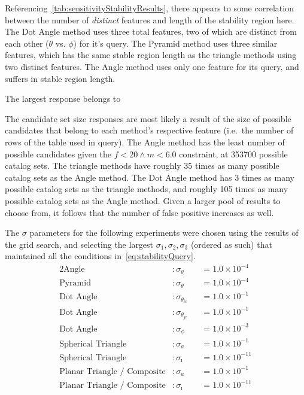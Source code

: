 Referencing~\autoref{tab:sensitivityStabilityResults}, there appears to some correlation between the number of
\textit{distinct} features and length of the stability region here.
The Dot Angle method uses three total features, two of which are distinct from each other ($\theta$ vs. $\phi$) for
it's query.
The Pyramid method uses three similar features, which has the same stable region length as the triangle methods
using two distinct features.
The Angle method uses only one feature for its query, and suffers in stable region length.

The largest response belongs to

The candidate set size responses are most likely a result of the size of possible candidates that belong to each
method's respective feature (i.e.\ the number of rows of the table used in query).
The Angle method has the least number of possible candidates given the $f < 20 \land m < 6.0$ constraint, at 353700
possible catalog sets.
The triangle methods have roughly 35 times as many possible catalog sets as the Angle method.
The Dot Angle method has 3 times as many possible catalog sets as the triangle methods, and roughly 105 times as many
possible catalog sets as the Angle method.
Given a larger pool of results to choose from, it follows that the number of false positive increases as well.

The $\sigma$ parameters for the following experiments were chosen using the results of the grid search, and selecting
the largest $\sigma_1, \sigma_2, \sigma_3$ (ordered as such) that maintained all the
conditions in~\autoref{eq:stabilityQuery}.
\begin{alignat*}{2}
    \text{Angle}&: \sigma_\theta &&= 1.0 \times 10^{-4}\\
    \text{Pyramid}&: \sigma_\theta &&= 1.0 \times 10^{-4}\\
    \text{Dot Angle}&: \sigma_{\theta_{ic}} &&= 1.0 \times 10^{-1}\\
    \text{Dot Angle}&: \sigma_{\theta_{jc}} &&= 1.0 \times 10^{-1}\\
    \text{Dot Angle}&: \sigma_\phi &&= 1.0 \times 10^{-3} \\
    \text{Spherical Triangle}&: \sigma_a &&= 1.0 \times 10^{-1}\\
    \text{Spherical Triangle}&: \sigma_\imath &&= 1.0 \times 10^{-11}\\
    \text{Planar Triangle / Composite}&: \sigma_a &&= 1.0 \times 10^{-1} \\
    \text{Planar Triangle / Composite}&: \sigma_\imath &&= 1.0 \times 10^{-11}\\
\end{alignat*}

